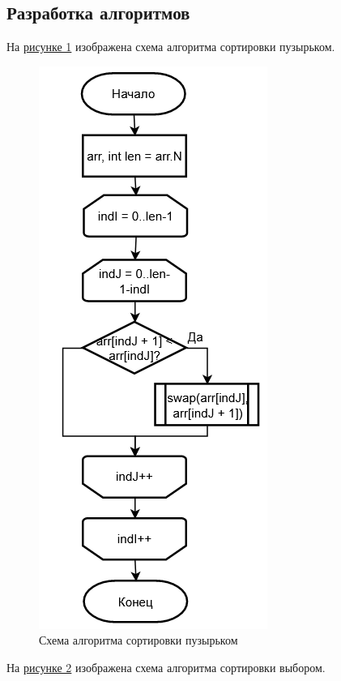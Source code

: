 \documentclass[14pt, a4paper]{extarticle}
\begin{document}
\subsection{Разработка алгоритмов}
На \hyperref[Schema1]{рисунке 1} изображена схема алгоритма сортировки пузырьком.
\begin{figure}[h!]
	\centering
	\includegraphics[height=0.7\textheight]{source/Schema1.png}
	\caption{Схема алгоритма сортировки пузырьком}
	\label{Schema1}
\end{figure}
\clearpage
На \hyperref[Schema2]{рисунке 2} изображена схема алгоритма сортировки выбором.
\end{document}
